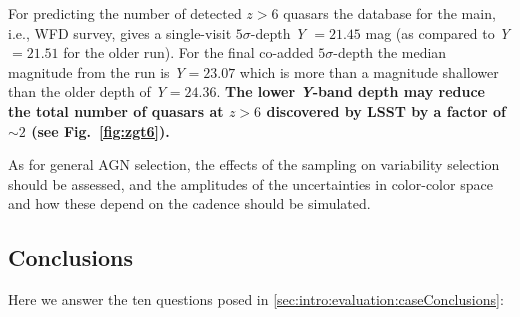 For predicting the number of detected $z>6$ quasars
the
\OpSim database for the main, i.e., WFD survey, gives a
single-visit $5\sigma$-depth
{\it Y} $= 21.45$ mag (as compared to {\it Y} $= 21.51$ for the older  run).
For the final co-added $5\sigma$-depth the median magnitude from the 
\OpSim run is
{\it Y}$ = 23.07$ which is more than a magnitude shallower than the older 
depth of {\it Y}$ = 24.36$.
{\bf The lower {\it Y}-band depth may reduce the total number of quasars at $z > 6$ discovered by LSST by
a factor of $\sim 2$
(see Fig.~\ref{fig:zgt6}).}



As for general AGN selection, the effects of the sampling on variability selection
should be assessed, and the amplitudes of the uncertainties in color-color space
and how these depend on the cadence should be simulated.

%
%
%
%

\subsection{Conclusions}

Here we answer the ten questions posed in
\autoref{sec:intro:evaluation:caseConclusions}:

